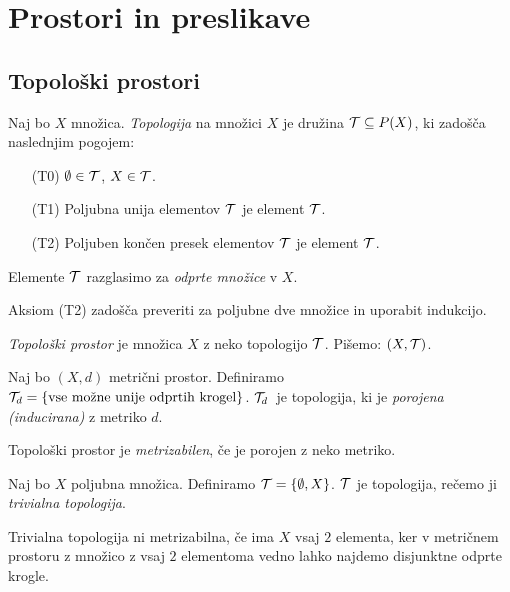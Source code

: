 \section{Prostori in preslikave}
\subsection{Topološki prostori}
\begin{definicija}
    Naj bo $X$ množica. \emph{Topologija} na množici $X$ je družina $\mathcal{T} \subseteq P(X)$, ki zadošča naslednjim pogojem:
    \begin{enumerate}
        \item[(T0)] $\emptyset \in \mathcal{T}$, $X \in \mathcal{T}$.
        \item[(T1)] Poljubna unija elementov $\mathcal{T}$ je element $\mathcal{T}$.
        \item[(T2)] Poljuben končen presek elementov $\mathcal{T}$ je element $\mathcal{T}$.
    \end{enumerate}
    Elemente $\mathcal{T}$ razglasimo za \emph{odprte množice} v $X$.
\end{definicija}

\begin{opomba}
    Aksiom (T2) zadošča preveriti za poljubne dve množice in uporabit indukcijo.
\end{opomba}

\begin{definicija}
    \emph{Topološki prostor} je množica $X$ z neko topologijo $\mathcal{T}$. Pišemo: $(X, \mathcal{T})$.
\end{definicija}

\begin{primer}
    Naj bo $(X, d)$ metrični prostor. Definiramo $\mathcal{T}_d = \left\{\text{vse možne unije odprtih krogel}\right\}$. $\mathcal{T}_d$~je topologija, ki je \emph{porojena (inducirana)} z metriko $d$.
\end{primer}

\begin{definicija}
    Topološki prostor je \emph{metrizabilen}, če je porojen z neko metriko.
\end{definicija}

\begin{primer}
    Naj bo $X$ poljubna množica. Definiramo $\mathcal{T} = \left\{\emptyset, X\right\}$. $\mathcal{T}$ je topologija, rečemo ji \emph{trivialna topologija}.

    Trivialna topologija ni metrizabilna, če ima $X$ vsaj $2$ elementa, ker v metričnem prostoru z množico z vsaj $2$ elementoma vedno lahko najdemo disjunktne odprte krogle.
\end{primer}


